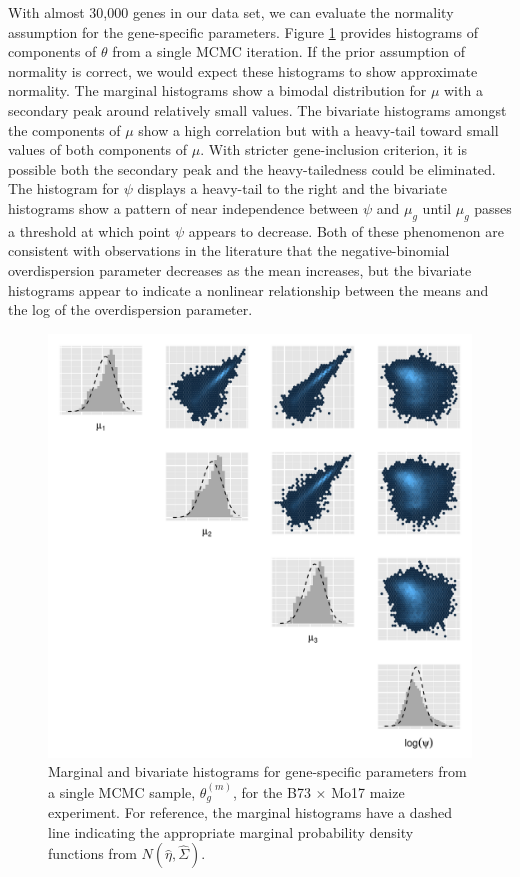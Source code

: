 \documentclass[useAMS,usenatbib,referee]{biom}
\begin{document}
With almost 30,000 genes in our data set, we can evaluate the normality assumption for the gene-specific parameters. Figure \ref{f:normality} provides histograms of components of $\theta$ from a single MCMC iteration.
If the prior assumption of normality is correct, we would expect these histograms to show approximate normality. The marginal histograms show a bimodal distribution for $\mu$ with a secondary peak around relatively small values. The bivariate histograms amongst the components of $\mu$ show a high correlation but with a heavy-tail toward small values of both components of $\mu$. With stricter gene-inclusion criterion, it is possible both the secondary peak and the heavy-tailedness could be eliminated. The histogram for $\psi$ displays a heavy-tail to the right and the bivariate histograms show a pattern of near independence between $\psi$ and $\mu_g$ until $\mu_g$ passes a threshold at which point $\psi$ appears to decrease. Both of these phenomenon are consistent with observations in the literature that the negative-binomial overdispersion parameter decreases as the mean increases, but the bivariate histograms appear to indicate a nonlinear relationship between the means and the log of the overdispersion parameter.

\begin{figure}
\centerline{\includegraphics[width=\textwidth]{normality}}
\caption{Marginal and bivariate histograms for gene-specific parameters from a single MCMC sample, $\theta_g^{(m)}$,  for the B73 $\times$ Mo17 maize experiment. For reference, the marginal histograms have a dashed line indicating the appropriate marginal probability density functions from $N(\hat{\eta},\hat{\Sigma})$.}
\label{f:normality}
\end{figure}
\end{document}
